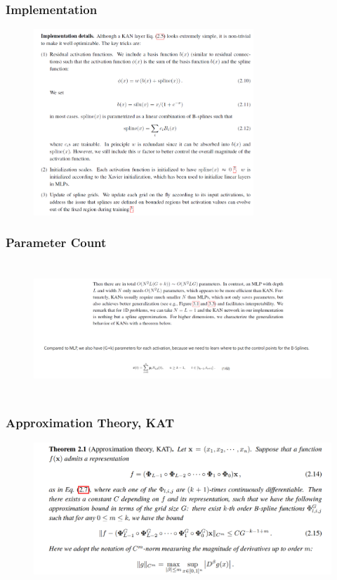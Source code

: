 \documentclass[serif, aspectratio=169]{beamer}
\begin{document}
\begin{frame}
    \frametitle<presentation>{Implementation}
    \begin{figure}
        \centering
        \includegraphics[height=7cm]{image copy 13.png}
    \end{figure}
\end{frame}
\begin{frame}
    \frametitle<presentation>{Parameter Count}
    \begin{figure}
        \centering
        \includegraphics[height=5cm]{image copy 14.png}
    \end{figure}
\end{frame}
\begin{frame}
    \frametitle<presentation>{Approximation Theory, KAT}
    \begin{figure}
        \centering
        \includegraphics[height=5cm]{image copy 15.png}
    \end{figure}
\end{frame}
\end{document}
